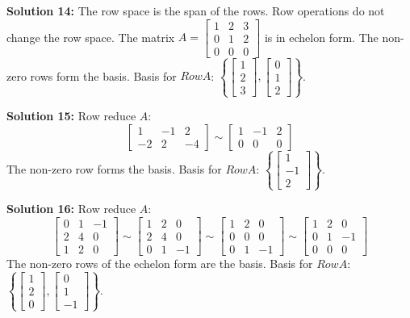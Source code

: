 \documentclass[11pt]{article}
\begin{document}
\vspace{0.3cm}
\textbf{Solution 14:} The row space is the span of the rows. Row operations do not change the row space. The matrix $A = \begin{bmatrix} 1 & 2 & 3 \\ 0 & 1 & 2 \\ 0 & 0 & 0 \end{bmatrix}$ is in echelon form. The non-zero rows form the basis.
Basis for $Row A$: $\left\{ \begin{bmatrix} 1 \\ 2 \\ 3 \end{bmatrix}, \begin{bmatrix} 0 \\ 1 \\ 2 \end{bmatrix} \right\}$.

\vspace{0.3cm}
\textbf{Solution 15:} Row reduce $A$:
$$ \begin{bmatrix} 1 & -1 & 2 \\ -2 & 2 & -4 \end{bmatrix} \sim \begin{bmatrix} 1 & -1 & 2 \\ 0 & 0 & 0 \end{bmatrix} $$
The non-zero row forms the basis.
Basis for $Row A$: $\left\{ \begin{bmatrix} 1 \\ -1 \\ 2 \end{bmatrix} \right\}$.

\vspace{0.3cm}
\textbf{Solution 16:} Row reduce $A$:
$$ \begin{bmatrix} 0 & 1 & -1 \\ 2 & 4 & 0 \\ 1 & 2 & 0 \end{bmatrix} \sim \begin{bmatrix} 1 & 2 & 0 \\ 2 & 4 & 0 \\ 0 & 1 & -1 \end{bmatrix} \sim \begin{bmatrix} 1 & 2 & 0 \\ 0 & 0 & 0 \\ 0 & 1 & -1 \end{bmatrix} \sim \begin{bmatrix} 1 & 2 & 0 \\ 0 & 1 & -1 \\ 0 & 0 & 0 \end{bmatrix} $$
The non-zero rows of the echelon form are the basis.
Basis for $Row A$: $\left\{ \begin{bmatrix} 1 \\ 2 \\ 0 \end{bmatrix}, \begin{bmatrix} 0 \\ 1 \\ -1 \end{bmatrix} \right\}$.
\end{document}
